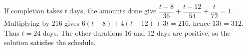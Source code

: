 If completion takes $t$ days, the amounts done give $\dfrac{t-8}{36}+\dfrac{t-12}{54}+\dfrac{t}{72}=1$. Multiplying by 216 gives $6(t-8)+4(t-12)+3t=216$, hence $13t=312$. Thus $\boxed{t=24}$ days. The other durations 16 and 12 days are positive, so the solution satisfies the schedule.
